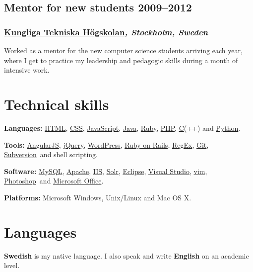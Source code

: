\documentclass[a4paper,11pt]{article}
\newcommand{\thework}[2]{
  \subsection*{\textbf{#1} \hfill \textbf{#2}}\par%
}
\newcommand{\theplace}[2][]{%
  \subsubsection*{\textbf{#2}\textsl{#1}}%
}
\newcommand{\runin}[1]{%
  \vspace{2mm}
  \hspace{0mm}%
  {\normalsize \bfseries #1}%
}
\def\angularjs{\href{http://angularjs.org}{AngularJS}}
\def\apache{\href{http://httpd.apache.org/}{Apache}}
\def\clang{\href{http://en.wikipedia.org/wiki/C_\%28programming_language\%29}{C}}
\def\css{\href{http://en.wikipedia.org/wiki/Cascading_Style_Sheets}{CSS}}
\def\eclipse{\href{http://www.eclipse.org/eclipse/}{Eclipse}}
\def\git{\href{http://git-scm.com/}{Git}}
\def\html{\href{http://en.wikipedia.org/wiki/HTML}{HTML}}
\def\iis{\href{http://www.iis.net/}{IIS}}
\def\java{\href{http://www.java.com/}{Java}}
\def\javascript{\href{http://en.wikipedia.org/wiki/JavaScript}{JavaScript}}
\def\jquery{\href{http://jquery.com/}{jQuery}}
\def\mysql{\href{http://www.mysql.com/}{MySQL}}
\def\office{\href{http://office.microsoft.com/}{Microsoft Office}}
\def\photoshop{\href{http://www.adobe.com/products/photoshop.html}{Photoshop}}
\def\php{\href{http://php.net}{PHP}}
\def\python{\href{http://www.python.org/}{Python}}
\def\regex{\href{http://en.wikipedia.org/wiki/Regular_expressions}{RegEx}}
\def\ror{\href{http://rubyonrails.org}{Ruby on Rails}}
\def\ruby{\href{http://www.ruby-lang.org/}{Ruby}}
\def\solr{\href{http://lucene.apache.org/solr/}{Solr}}
\def\svn{\href{http://subversion.apache.org/}{Subversion}}
\def\vim{\href{http://www.vim.org/}{vim}}
\def\wordpress{\href{http://wordpress.org}{WordPress}}
\def\vs{\href{http://www.microsoft.com/visualstudio/}{Visual Studio}}
\begin{document}
\thework{Mentor for new students}{2009--2012}
\theplace[, Stockholm, Sweden]{\href{http://kth.se}{Kungliga Tekniska Högskolan}}
Worked as a mentor for the new computer science students arriving each
year, where I get to practice my leadership and pedagogic skills during a month
of intensive work.

\section*{Technical skills}%
\vspace{-2mm}

\runin{Languages:} \html, \css, \javascript, \java, \ruby, \php, \clang(++) and \python.

\runin{Tools:} \angularjs, \jquery, \wordpress, \ror, \regex, \git, \svn\ and shell scripting.

\runin{Software:} \mysql, \apache, \iis, \solr, \eclipse, \vs, \vim, \photoshop\ and \office.

\runin{Platforms:} Microsoft Windows, Unix/Linux and Mac OS X.

\section*{Languages}%
\textbf{Swedish} is my native language. I also speak and write \textbf{English} on an academic level.
\end{document}
